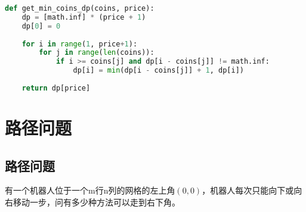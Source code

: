 
\begin{lstlisting}[language=Python]
def get_min_coins_dp(coins, price):
    dp = [math.inf] * (price + 1)
    dp[0] = 0
    
    for i in range(1, price+1):
        for j in range(len(coins)):
            if i >= coins[j] and dp[i - coins[j]] != math.inf:
                dp[i] = min(dp[i - coins[j]] + 1, dp[i])
    
    return dp[price]
\end{lstlisting}

\newpage

\section{路径问题}

\subsection{路径问题}

有一个机器人位于一个m行n列的网格的左上角$ (0, 0) $，机器人每次只能向下或向右移动一步，问有多少种方法可以走到右下角。

\begin{table}[H]
	\centering
	\caption{起点}
\end{table}

